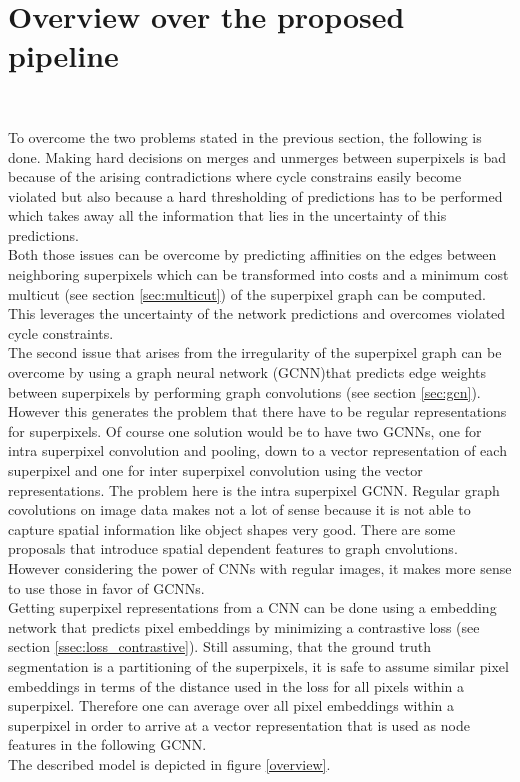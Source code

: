 \section{Overview over the proposed pipeline}~\label{seg:ov_pip}

To overcome the two problems stated in the previous section, the following is done. Making hard decisions on merges and unmerges between superpixels is bad because of the arising contradictions where cycle constrains easily become violated but also because a hard thresholding of predictions has to be performed which takes away all the information that lies in the uncertainty of this predictions.\\
Both those issues can be overcome by predicting affinities on the edges between neighboring superpixels which can be transformed into costs and a minimum cost multicut (see section \ref{sec:multicut}) of the superpixel graph can be computed. This leverages the uncertainty of the network predictions and overcomes violated cycle constraints.\\
The second issue that arises from the irregularity of the superpixel graph can be overcome by using a graph neural network (GCNN)that predicts edge weights between superpixels by performing graph convolutions (see section \ref{sec:gcn}). However this generates the problem that there have to be regular representations for superpixels. Of course one solution would be to have two GCNNs, one for intra superpixel convolution and pooling, down to a vector representation of each superpixel and one for inter superpixel convolution using the vector representations. The problem here is the intra superpixel GCNN. Regular graph covolutions on image data makes not a lot of sense because it is not able to capture spatial information like object shapes very good. There are some proposals \cite{monti2016geometric} that introduce spatial dependent features to graph cnvolutions. However considering the power of CNNs with regular images, it makes more sense to use those in favor of GCNNs.\\
Getting superpixel representations from a CNN can be done using a embedding network that predicts pixel embeddings by minimizing a contrastive loss (see section \ref{ssec:loss_contrastive}). Still assuming, that the ground truth segmentation is a partitioning of the superpixels, it is safe to assume similar pixel embeddings in terms of the distance used in the loss for all pixels within a superpixel. Therefore one can average over all pixel embeddings within a superpixel in order to arrive at a vector representation that is used as node features in the following GCNN.\\
The described model is depicted in figure \ref{overview}.


